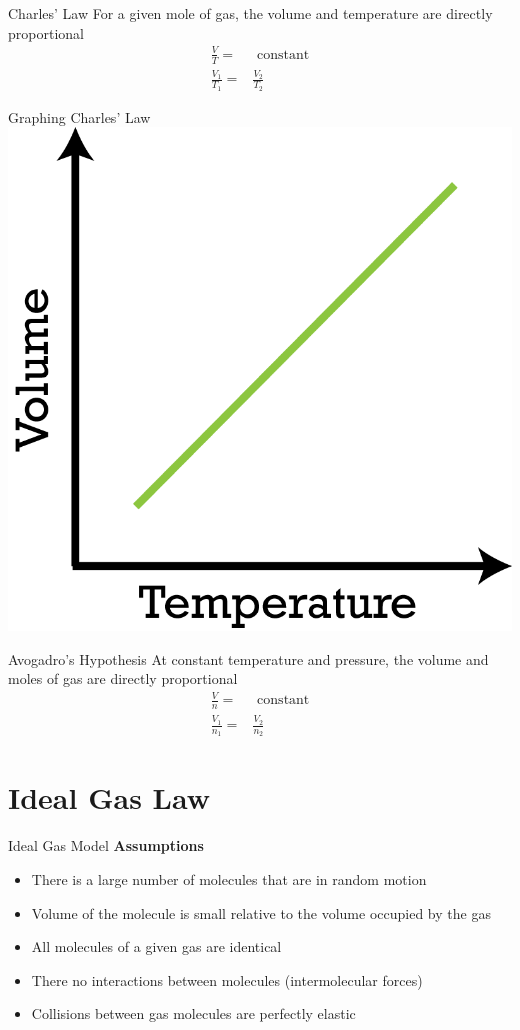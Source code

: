 \documentclass[11pt]{beamer}
\begin{document}
\begin{frame}{Charles' Law}
  For a given mole of gas, the volume and temperature are directly
  proportional
  \begin{align}
    \frac{V}{T} = & \text{ constant} \\
    \frac{V_1}{T_1} = & \frac{V_2}{T_2}
  \end{align}
\end{frame}

\begin{frame}{Graphing Charles' Law}
  \centering
  \includegraphics[width=0.6\linewidth]{charles_graph}
\end{frame}

\begin{frame}{Avogadro's Hypothesis}
  At constant temperature and pressure, the volume and moles of gas
  are directly proportional
  \begin{align}
    \frac{V}{n} = & \text{ constant} \\
    \frac{V_1}{n_1} = & \frac{V_2}{n_2}
  \end{align}
\end{frame}

\section{Ideal Gas Law}

\begin{frame}{Ideal Gas Model}
  \textbf{Assumptions}
  \begin{itemize}
  \item There is a large number of molecules that are
    in random motion
  \item Volume of the molecule is small relative to the volume occupied
    by the gas
  \item All molecules of a given gas are identical
  \item There no interactions between molecules (intermolecular forces)
  \item Collisions between gas molecules are perfectly elastic
  \end{itemize}
\end{frame}
\end{document}
